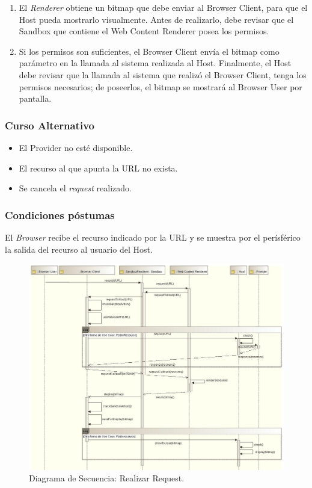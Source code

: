 \begin{enumerate}
		\item El \textit{Renderer} obtiene un bitmap que debe enviar al Browser Client, para que el Host pueda mostrarlo visualmente. Antes de realizarlo, debe revisar que el Sandbox que contiene el Web Content Renderer posea los permisos.
		\item Si los permisos son suficientes, el Browser Client envía el bitmap como parámetro en la llamada al sistema realizada al Host. Finalmente, el Host debe revisar que la llamada al sistema que realizó el Browser Client, tenga los permisos necesarios; de poseerlos, el bitmap se mostrará al Browser User por pantalla.
	\end{enumerate}
\subsubsection{Curso Alternativo} 
\begin{itemize}
\item El Provider no esté disponible.
\item El recurso al que apunta la URL no exista.
\item Se cancela el \textit{request} realizado.
	\end{itemize}
\subsubsection{Condiciones póstumas} El \textit{Browser} recibe el recurso indicado por la URL y se muestra por el perísférico la salida del recurso al usuario del Host.
	\begin{landscape}
	    \begin{figure}[h!t]
	        \centering
	        \includegraphics[scale=0.61]{figures/chap4/requestResource_v2.jpg}
	        \caption{Diagrama de Secuencia: Realizar Request.}
	        \label{fig:SecReq}
	    \end{figure}
	\end{landscape}
